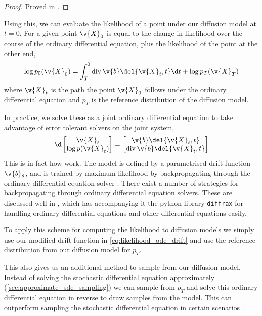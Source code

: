 \begin{proof}
	Proved in \textcite[appendix A]{chen2018neural}.
\end{proof}
Using this, we can evaluate the likelihood of a point under our diffusion model at \(t=0\).
For a given point \(\v{X}_0\) is equal to the change in likelihood over the course of the ordinary differential equation, plus the likelihood of the point at the other end, \[\log p_0(\v{X}_0) = \int_T^0 \dive \v{b}\del{\v{X}_t, t} \d t + \log p_T(\v{X}_T)\]
where \(\v{X}_t\) is the path the point \(\v{X}_0\) follows under the ordinary differential equation and \(p_T\) is the reference distribution of the diffusion model.

In practice, we solve these as a joint ordinary differential equation to take advantage of error tolerant solvers on the joint system,
\[
	\d 
	\begin{bmatrix}
		\v{X}_t \\ \log p(\v{X}_t)
	\end{bmatrix} = 
	\begin{bmatrix}
		\v{b}\del{\v{X}_t, t} \\ \dive \v{b} \del{\v{X}_t, t}
	\end{bmatrix}
\]
This is in fact how  \parencite{chen2018neural} work. 
The model is defined by a parametrised drift function \(\v{b}_\theta\), and is trained by maximum likelihood by backpropagating through the ordinary differential equation solver \parencite{chen2018neural}. 
There exist a number of strategies for backpropagating through ordinary differential equation solvers.
These are discussed well in \textcite{kidger2021on}, which has accompanying it the python library \verb|diffrax|  for handling ordinary differential equations and other differential equations easily.

To apply this scheme for computing the likelihood to diffusion models we simply use our modified drift function in \cref{eq:likelihood_ode_drift} and use the reference distribution from our diffusion model for \(p_T\).

This also gives us an additional method to sample from our diffusion model. 
Instead of solving the stochastic differential equation approximately (\cref{sec:approximate_sde_sampling}) we can sample from \(p_T\) and solve this ordinary differential equation in reverse to draw samples from the model.
This can outperform sampling the stochastic differential equation in certain scenarios \parencite{karras2022Elucidating,song2019generative}.



